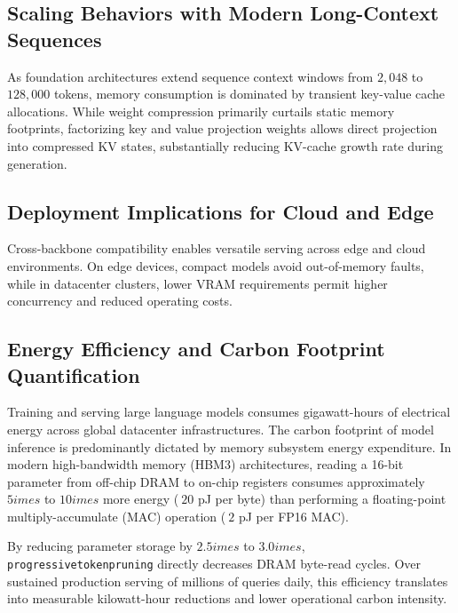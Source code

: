\subsection{Scaling Behaviors with Modern Long-Context Sequences}
As foundation architectures extend sequence context windows from $2{,}048$ to $128{,}000$ tokens, memory consumption is dominated by transient key-value cache allocations. While weight compression primarily curtails static memory footprints, factorizing key and value projection weights allows direct projection into compressed KV states, substantially reducing KV-cache growth rate during generation.

\subsection{Deployment Implications for Cloud and Edge}
Cross-backbone compatibility enables versatile serving across edge and cloud environments. On edge devices, compact models avoid out-of-memory faults, while in datacenter clusters, lower VRAM requirements permit higher concurrency and reduced operating costs.

\subsection{Energy Efficiency and Carbon Footprint Quantification}
Training and serving large language models consumes gigawatt-hours of electrical energy across global datacenter infrastructures. The carbon footprint of model inference is predominantly dictated by memory subsystem energy expenditure. In modern high-bandwidth memory (HBM3) architectures, reading a 16-bit parameter from off-chip DRAM to on-chip registers consumes approximately $5	imes$ to $10	imes$ more energy ($~20$ pJ per byte) than performing a floating-point multiply-accumulate (MAC) operation ($~2$ pJ per FP16 MAC).

By reducing parameter storage by $2.5	imes$ to $3.0	imes$, \texttt{progressivetokenpruning} directly decreases DRAM byte-read cycles. Over sustained production serving of millions of queries daily, this efficiency translates into measurable kilowatt-hour reductions and lower operational carbon intensity.
